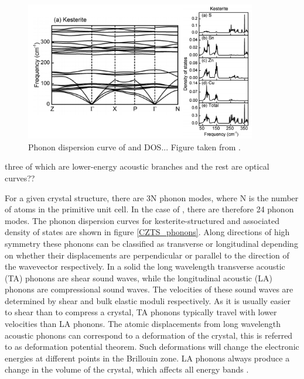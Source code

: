\begin{figure}[h!]
  \centering
    \includegraphics[width=0.9\textwidth]{figures/CZTS_phonons.png}
    \caption{Phonon dispersion curve of {\CZTS} and DOS... Figure taken from .}
  \label{defects}
\end{figure}

three of which are lower-energy acoustic branches and the rest are optical curves??

For a given crystal structure, there are 3N phonon modes, where N is the number of atoms in the primitive unit cell. In the case of {\CZTS}, there are therefore 24 phonon modes. The phonon dispersion curves for kesterite-structured {\CZTS} and associated density of states are shown in figure \ref{CZTS_phonons}.
Along directions of high symmetry these phonons can be classified as transverse or longitudinal depending on whether their displacements are perpendicular or parallel to the direction of the wavevector respectively. In a solid the long wavelength transverse acoustic (TA) phonons are shear sound waves, while the longitudinal acoustic (LA) phonons are compressional sound waves. The velocities of these sound waves are determined by shear and bulk elastic moduli respectively. As it is usually easier to shear than to compress a crystal, TA phonons typically travel with lower velocities than LA phonons.  
The atomic displacements from long wavelength acoustic phonons can correspond to a deformation of the crystal, this is referred to as deformation potential theorem. Such deformations will change the electronic energies at different points in the Brillouin zone. LA phonons always produce a change in the volume of the crystal, which affects all energy bands \cite{fund_semi}.\\

